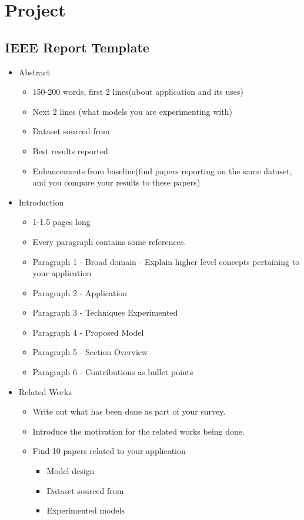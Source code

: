 \documentclass[11pt]{article}
\begin{document}
\section{Project}
\label{sec:org3f8b33c}
\subsection{IEEE Report Template}
\label{sec:org2d9d78e}
\begin{itemize}
\item Abstract
\begin{itemize}
\item 150-200 words, first 2 lines(about application and its uses)
\item Next 2 lines (what models you are experimenting with)
\item Dataset sourced from
\item Best results reported
\item Enhancements from baseline(find papers reporting on the same dataset, and you compare your results to these papers)
\end{itemize}
\item Introduction
\begin{itemize}
\item 1-1.5 pages long
\item Every paragraph contains some references.
\item Paragraph 1 - Broad domain - Explain higher level concepts pertaining to your application
\item Paragraph 2 - Application
\item Paragraph 3 - Techniques Experimented
\item Paragraph 4 - Proposed Model
\item Paragraph 5 - Section Overview
\item Paragraph 6 - Contributions as bullet points
\end{itemize}
\item Related Works
\begin{itemize}
\item Write out what has been done as part of your survey.
\item Introduce the motivation for the related works being done.
\item Find 10 papers related to your application
\begin{itemize}
\item Model design
\item Dataset sourced from
\item Experimented models

\end{itemize}
\end{itemize}
\end{itemize}
\end{document}
